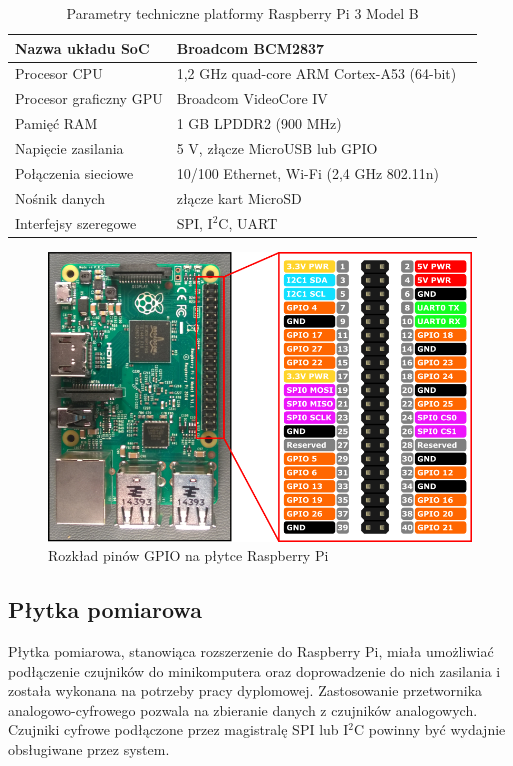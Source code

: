 \begin{table}[t]
\label{tabRpi}
\centering
\begin{tabular}{|l|l|l|}
  \hline 
  Nazwa układu SoC & Broadcom BCM2837 \\
  \hline
  Procesor CPU & 1,2 GHz quad-core ARM Cortex-A53 (64-bit) \\
  \hline
 Procesor graficzny GPU & Broadcom VideoCore IV \\ 
  \hline 
  Pamięć RAM  & 1 GB LPDDR2 (900 MHz) \\
  \hline
 Napięcie zasilania & 5 V, złącze MicroUSB lub GPIO\\
  \hline
 Połączenia sieciowe & 10/100 Ethernet, Wi-Fi (2,4 GHz 802.11n) \\
  \hline
 Nośnik danych  & złącze kart MicroSD \\
 \hline
 Interfejsy szeregowe & SPI, I$^2$C, UART \\ 
  \hline
\end{tabular}
\caption{Parametry techniczne platformy Raspberry Pi 3 Model B 
\cite{rpispecs}
} 
\end{table}

\begin{figure}[h]
	\centering
		\includegraphics[width=12cm]{rpipinout}
	\caption{Rozkład pinów GPIO na płytce Raspberry Pi} 
	\label{pic:rpipinout}
\end{figure}



\subsection{Płytka pomiarowa}

Płytka pomiarowa, stanowiąca rozszerzenie do Raspberry Pi, miała umożliwiać podłączenie czujników do minikomputera oraz doprowadzenie do nich zasilania i została wykonana na potrzeby pracy dyplomowej. 
Zastosowanie przetwornika analogowo-cyfrowego pozwala na zbieranie danych z czujników analogowych. Czujniki cyfrowe podłączone przez magistralę SPI lub I$^2$C powinny być wydajnie obsługiwane przez system.

